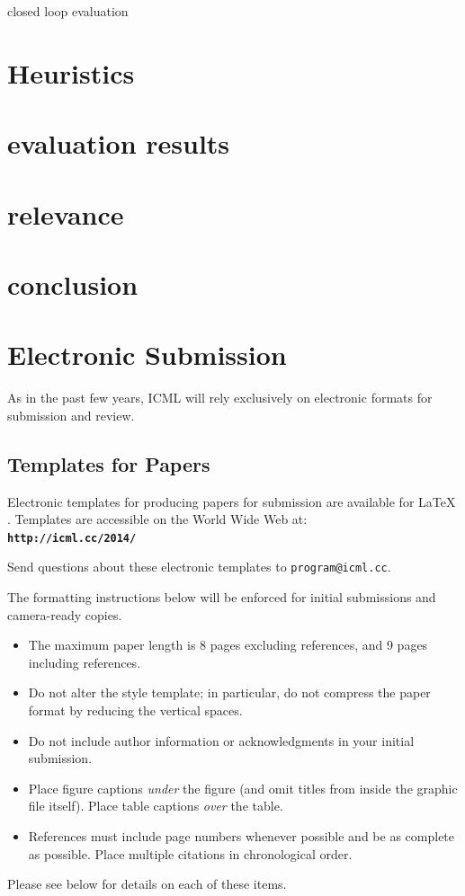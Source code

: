 \documentclass{article}
\begin{document}
	closed loop evaluation 
	
	

\section{Heuristics}
\section{evaluation results}

\section{relevance}

\section{conclusion}







\section{Electronic Submission}
\label{submission}

As in the past few years, ICML will rely exclusively on
electronic formats for submission and review. 


\subsection{Templates for Papers}

Electronic templates for producing papers for submission are available
for \LaTeX\/ . Templates are accessible on the World
Wide Web at:\\
\textbf{\texttt{http://icml.cc/2014/}}

\noindent
Send questions about these electronic templates to
\texttt{program@icml.cc}.

The formatting instructions below will be enforced for initial submissions and camera-ready copies. 
\begin{itemize}
\item The maximum paper length is 8 pages excluding references, and 
9 pages including references.
\item Do not alter the style template; in particular, do not compress the paper format 
by reducing the vertical spaces.
\item Do not include author information or acknowledgments in your
  initial submission. 
\item Place figure captions {\em under} the figure (and omit titles from
  inside the graphic file itself).  Place table captions {\em over}
  the table.
\item References must include page numbers whenever possible and be as
  complete as possible.  Place multiple citations in chronological order.  
\end{itemize}
Please see below for details on each of these items.
\end{document}

